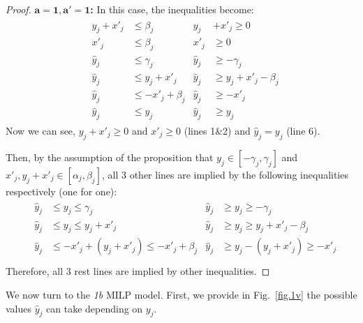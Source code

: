 \begin{proof}[Proof]
	
\textbf{$\mathbf{a = 1, a' = 1}$:} In this case, the inequalities become: \begin{align*}
	& \begin{aligned}
		y_j + x'_j &\leq \beta_j        &
		y_j &+ x'_j \geq 0 \\
		x'_j       &\leq \beta_j       & 
		x'_j       &\geq 0 \\
		\hat{y}_j  &\leq \gamma_j       &
		\hat{y}_j  &\geq -\gamma_j \\
		\hat{y}_j  &\leq y_j + x'_j  &
		\hat{y}_j  &\geq y_j + x'_j - \beta_j \\
		\hat{y}_j  &\leq -x'_j + \beta_j &
		\hat{y}_j  &\geq -x'_j \\
		\hat{y}_j  &\leq y_j &
		\hat{y}_j  &\geq y_j
	\end{aligned}
\end{align*} Now we can see, $y_j+x'_j\geq 0$ and $x'_j \geq 0$ (lines 1\&2) and $\hat{y}_j= y_j$ (line 6). 


Then, by the assumption of the proposition that $y_j \in [-\gamma_j, \gamma_j]$ and $x'_j,y_j+x'_j \in [\alpha_j,\beta_j]$, all 3 other lines are implied by the following inequalities respectively (one for one):\begin{align*}
	& \begin{aligned}
		\hat{y}_j  &\leq y_j\leq \gamma_j       &
		\hat{y}_j  &\geq y_j\geq -\gamma_j \\
		\hat{y}_j  &\leq y_j \leq y_j + x'_j  &
		\hat{y}_j  &\geq y_j \geq y_j + x'_j - \beta_j \\
		\hat{y}_j  &\leq -x'_j+(y_j+x'_j)\leq -x'_j + \beta_j &
		\hat{y}_j  &\geq y_j - (y_j+x'_j)\geq -x'_j \\
	\end{aligned}
\end{align*}Therefore, all 3 rest lines are implied by other inequalities.
	
\end{proof}


We now turn to the {\em 1b} MILP model. 
First, we provide in Fig.~\ref{fig.1v} the possible values $\hat{y}_j$ can take depending on $y_j$. 


